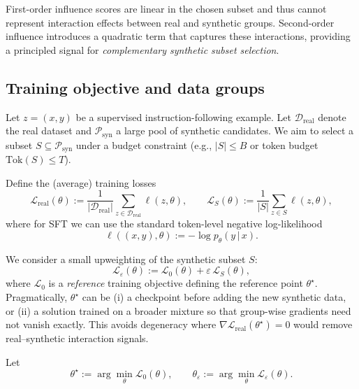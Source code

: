 \documentclass{article}
\theoremstyle{plain}
\theoremstyle{definition}
\theoremstyle{remark}
\begin{document}
First-order influence scores are linear in the chosen subset and thus cannot represent
interaction effects between real and synthetic groups.
Second-order influence introduces a quadratic term that captures these interactions,
providing a principled signal for \emph{complementary synthetic subset selection}.

\subsection{Training objective and data groups}
Let $z=(x,y)$ be a supervised instruction-following example.
Let $\mathcal{D}_{\mathrm{real}}$ denote the real dataset and $\mathcal{P}_{\mathrm{syn}}$ a large pool of synthetic candidates.
We aim to select a subset $S \subseteq \mathcal{P}_{\mathrm{syn}}$ under a budget constraint
(e.g., $|S|\le B$ or token budget $\mathrm{Tok}(S)\le T$).

Define the (average) training losses
\[
\mathcal{L}_{\mathrm{real}}(\theta) := \frac{1}{|\mathcal{D}_{\mathrm{real}}|}\sum_{z\in \mathcal{D}_{\mathrm{real}}} \ell(z,\theta),
\qquad
\mathcal{L}_{S}(\theta) := \frac{1}{|S|}\sum_{z\in S} \ell(z,\theta),
\]
where for SFT we can use the standard token-level negative log-likelihood
\[
\ell((x,y),\theta) := -\log p_\theta(y\,|\,x).
\]

We consider a small upweighting of the synthetic subset $S$:
\[
\mathcal{L}_\varepsilon(\theta) := \mathcal{L}_{0}(\theta) + \varepsilon \,\mathcal{L}_{S}(\theta),
\]
where $\mathcal{L}_{0}$ is a \emph{reference} training objective defining the reference point $\theta^\star$.
Pragmatically, $\theta^\star$ can be (i) a checkpoint before adding the new synthetic data,
or (ii) a solution trained on a broader mixture so that group-wise gradients need not vanish exactly.
This avoids degeneracy where $\nabla \mathcal{L}_{\mathrm{real}}(\theta^\star)=0$ would remove real--synthetic interaction signals.

Let
\[
\theta^\star := \arg\min_\theta \mathcal{L}_{0}(\theta),
\qquad
\theta_\varepsilon := \arg\min_\theta \mathcal{L}_{\varepsilon}(\theta).
\]
\end{document}
